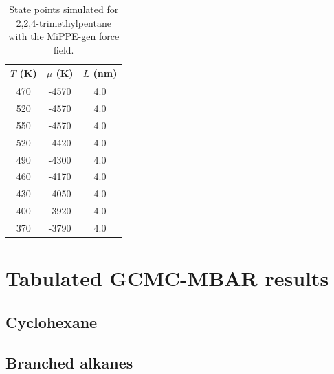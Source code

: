 \documentclass[journal=jctc,manuscript=article]{achemso}
\begin{document}
\begin{table}[htb!]
	\caption{State points simulated for 2,2,4-trimethylpentane with the MiPPE-gen force field.}
	\begin{center}
		\begin{tabular}{|c|c|c|}
			\hline
			$T$ (K) & $\mu$ (K) & $L$ (nm) \\ \hline
			470	&	-4570	&	4.0	\\
			520	&	-4570	&	4.0	\\
			550	&	-4570	&	4.0	\\
			520	&	-4420	&	4.0	\\
			490	&	-4300	&	4.0	\\
			460	&	-4170	&	4.0	\\
			430	&	-4050	&	4.0	\\
			400	&	-3920	&	4.0	\\
			370	&	-3790	&	4.0	\\
			\hline
		\end{tabular}
	\end{center}
\end{table}

\section{Tabulated GCMC-MBAR results} \label{SI sec: Tabulated MBAR results}

\subsection{Cyclohexane}

\subsection{Branched alkanes}
\end{document}
